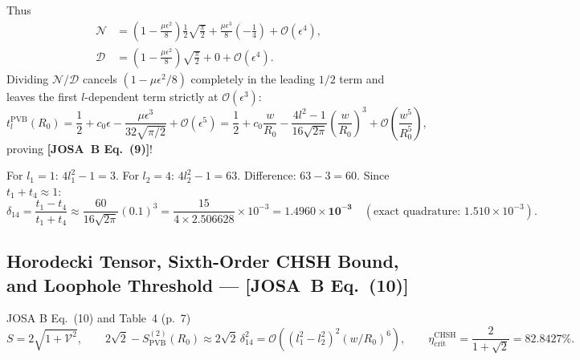 \documentclass[10pt,letterpaper]{article}
\newcommand{\josb}[1]{\textbf{[JOSA~B Eq.~(#1)]}}
\numberwithin{equation}{section}
\begin{document}
Thus
\begin{align}
  \mathcal{N} &= \left(1 - \frac{\mu\epsilon^2}{8}\right)\frac{1}{2}\sqrt{\frac{\pi}{2}} + \frac{\mu\epsilon^3}{8}\left(-\frac{1}{4}\right) + \mathcal{O}(\epsilon^4), \\
  \mathcal{D} &= \left(1 - \frac{\mu\epsilon^2}{8}\right)\sqrt{\frac{\pi}{2}} + 0 + \mathcal{O}(\epsilon^4).
\end{align}
Dividing $\mathcal{N}/\mathcal{D}$ cancels $(1 - \mu\epsilon^2/8)$ completely in the leading $1/2$ term and leaves the first $l$-dependent term strictly at $\mathcal{O}(\epsilon^3)$:
\begin{equation}
  t_l^{\mathrm{PVB}}(R_0) = \frac{1}{2} + c_0\epsilon - \frac{\mu\epsilon^3}{32\sqrt{\pi/2}} + \mathcal{O}(\epsilon^5) = \frac{1}{2} + c_0\frac{w}{R_0} - \frac{4l^2 - 1}{16\sqrt{2\pi}}\left(\frac{w}{R_0}\right)^3 + \mathcal{O}\!\left(\frac{w^5}{R_0^5}\right),
\end{equation}
proving \josb{9}!

\begin{pencheck}[Hand Arithmetic for $\delta_{14}$ at $w/R_0 = 0.1$]
For $l_1 = 1$: $4l_1^2 - 1 = 3$. For $l_2 = 4$: $4l_2^2 - 1 = 63$. Difference: $63 - 3 = 60$. Since $t_1 + t_4 \approx 1$:
\[
  \delta_{14} = \frac{t_1 - t_4}{t_1 + t_4} \approx \frac{60}{16\sqrt{2\pi}}(0.1)^3 = \frac{15}{4\times 2.506628}\times 10^{-3} = \mathbf{1.4960\times 10^{-3}}\quad(\text{exact quadrature: }1.510\times 10^{-3}).
\]
\end{pencheck}

\subsection{Horodecki Tensor, Sixth-Order CHSH Bound, and Loophole Threshold --- \josb{10}}
\label{sec:b6_chsh}

\begin{targeteq}{JOSA B Eq.~(10) and Table~4 (p.~7)}
\[
  S = 2\sqrt{1+\mathcal{V}^2}, \qquad 2\sqrt{2} - S_{\mathrm{PVB}}^{(2)}(R_0) \approx 2\sqrt{2}\,\delta_{14}^2 = \mathcal{O}\!\left((l_1^2-l_2^2)^2(w/R_0)^6\right), \qquad \eta_{\mathrm{crit}}^{\mathrm{CHSH}} = \frac{2}{1+\sqrt{2}} = 82.8427\%.
\]
\end{targeteq}
\end{document}
